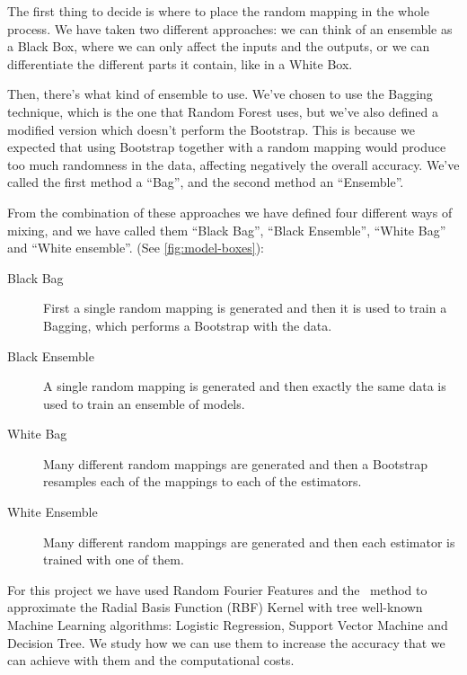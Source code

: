 \begin{pre-delivery}
  The first thing to decide is where to place the random mapping in the whole
  process. We have taken two different approaches: we can think of an
  ensemble as a Black Box, where we can only affect the inputs and the outputs,
  or we can differentiate the different parts it contain, like in a White Box.

  Then, there's what kind of ensemble to use. We've chosen to use the
  Bagging technique, which is the one that Random Forest uses, but we've
  also defined a modified version which doesn't perform the Bootstrap. This is
  because we expected that using Bootstrap together with a random mapping would
  produce too much randomness in the data, affecting negatively the
  overall accuracy. We've called the first method a ``Bag'', and the second
  method an ``Ensemble''.

  From the combination of these approaches we have defined four different
  ways of mixing, and we have called them
  ``Black Bag'', ``Black Ensemble'', ``White Bag'' and ``White ensemble''.
  (See \ref{fig:model-boxes}):

  \begin{description}
    \item[Black Bag] First a single random mapping is generated and then it
    is used to train a Bagging, which performs a Bootstrap with the data.
    \item[Black Ensemble] A single random mapping is generated and then exactly
    the same data is used to train an ensemble of models.
    \item[White Bag] Many different random mappings are generated and then a
    Bootstrap resamples each of the mappings to each of the estimators.
    \item[White Ensemble] Many different random mappings are generated and then
    each estimator is trained with one of them.
  \end{description}

  For this project we have used Random Fourier Features and the \Nys\
  method to approximate the Radial Basis Function (RBF) Kernel with tree
  well-known Machine Learning algorithms: Logistic Regression, Support Vector
  Machine and Decision Tree. We study how we can use them to increase
  the accuracy that we can achieve with them and the computational costs.


\end{pre-delivery}

